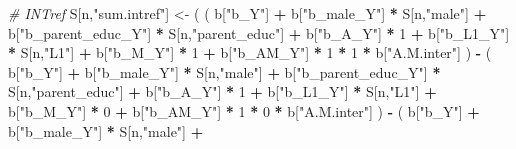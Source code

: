 \documentclass[
]{book}
\newenvironment{Shaded}{\begin{snugshade}}{\end{snugshade}}
\newcommand{\CommentTok}[1]{\textcolor[rgb]{0.56,0.35,0.01}{\textit{#1}}}
\newcommand{\DecValTok}[1]{\textcolor[rgb]{0.00,0.00,0.81}{#1}}
\newcommand{\NormalTok}[1]{#1}
\newcommand{\OtherTok}[1]{\textcolor[rgb]{0.56,0.35,0.01}{#1}}
\newcommand{\SpecialCharTok}[1]{\textcolor[rgb]{0.81,0.36,0.00}{\textbf{#1}}}
\newcommand{\StringTok}[1]{\textcolor[rgb]{0.31,0.60,0.02}{#1}}
\begin{document}
\begin{Shaded}
\begin{Highlighting}[]
    \CommentTok{\# INTref }
\NormalTok{    S[n,}\StringTok{"sum.intref"}\NormalTok{] }\OtherTok{\textless{}{-}}\NormalTok{ ( ( b[}\StringTok{"b\_Y"}\NormalTok{] }\SpecialCharTok{+} 
\NormalTok{                               b[}\StringTok{"b\_male\_Y"}\NormalTok{] }\SpecialCharTok{*}\NormalTok{ S[n,}\StringTok{"male"}\NormalTok{] }\SpecialCharTok{+} 
\NormalTok{                               b[}\StringTok{"b\_parent\_educ\_Y"}\NormalTok{] }\SpecialCharTok{*}\NormalTok{ S[n,}\StringTok{"parent\_educ"}\NormalTok{] }\SpecialCharTok{+} 
\NormalTok{                               b[}\StringTok{"b\_A\_Y"}\NormalTok{] }\SpecialCharTok{*} \DecValTok{1} \SpecialCharTok{+} 
\NormalTok{                               b[}\StringTok{"b\_L1\_Y"}\NormalTok{] }\SpecialCharTok{*}\NormalTok{ S[n,}\StringTok{"L1"}\NormalTok{] }\SpecialCharTok{+}
\NormalTok{                               b[}\StringTok{"b\_M\_Y"}\NormalTok{] }\SpecialCharTok{*} \DecValTok{1} \SpecialCharTok{+}
\NormalTok{                               b[}\StringTok{"b\_AM\_Y"}\NormalTok{] }\SpecialCharTok{*} \DecValTok{1} \SpecialCharTok{*} \DecValTok{1} \SpecialCharTok{*}\NormalTok{ b[}\StringTok{"A.M.inter"}\NormalTok{] ) }\SpecialCharTok{{-}} 
\NormalTok{                             ( b[}\StringTok{"b\_Y"}\NormalTok{] }\SpecialCharTok{+} 
\NormalTok{                                 b[}\StringTok{"b\_male\_Y"}\NormalTok{] }\SpecialCharTok{*}\NormalTok{ S[n,}\StringTok{"male"}\NormalTok{] }\SpecialCharTok{+} 
\NormalTok{                                 b[}\StringTok{"b\_parent\_educ\_Y"}\NormalTok{] }\SpecialCharTok{*}\NormalTok{ S[n,}\StringTok{"parent\_educ"}\NormalTok{] }\SpecialCharTok{+} 
\NormalTok{                                 b[}\StringTok{"b\_A\_Y"}\NormalTok{] }\SpecialCharTok{*} \DecValTok{1} \SpecialCharTok{+} 
\NormalTok{                                 b[}\StringTok{"b\_L1\_Y"}\NormalTok{] }\SpecialCharTok{*}\NormalTok{ S[n,}\StringTok{"L1"}\NormalTok{] }\SpecialCharTok{+}
\NormalTok{                                 b[}\StringTok{"b\_M\_Y"}\NormalTok{] }\SpecialCharTok{*} \DecValTok{0} \SpecialCharTok{+}
\NormalTok{                                 b[}\StringTok{"b\_AM\_Y"}\NormalTok{] }\SpecialCharTok{*} \DecValTok{1} \SpecialCharTok{*} \DecValTok{0} \SpecialCharTok{*}\NormalTok{ b[}\StringTok{"A.M.inter"}\NormalTok{] ) }\SpecialCharTok{{-}} 
\NormalTok{                             ( b[}\StringTok{"b\_Y"}\NormalTok{] }\SpecialCharTok{+} 
\NormalTok{                                 b[}\StringTok{"b\_male\_Y"}\NormalTok{] }\SpecialCharTok{*}\NormalTok{ S[n,}\StringTok{"male"}\NormalTok{] }\SpecialCharTok{+} 

\end{Highlighting}
\end{Shaded}
\end{document}
